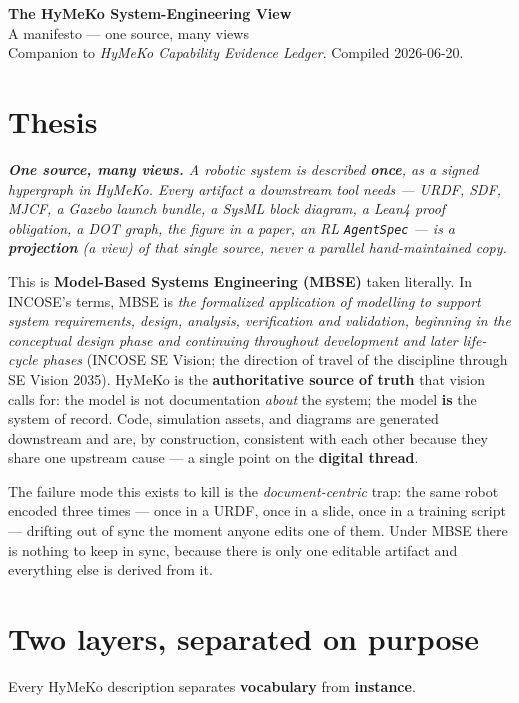 \documentclass[11pt]{article}
\newcommand{\code}[1]{\texttt{\small #1}}
\newenvironment{quotebox}{\begin{center}\begin{minipage}{0.92\textwidth}\itshape\color{black!75}}{\end{minipage}\end{center}}
\begin{document}
\begin{center}
  {\LARGE\bfseries The HyMeKo System-Engineering View}\\[3pt]
  {\large A manifesto --- one source, many views}\\[6pt]
  {\small Companion to \emph{HyMeKo Capability Evidence Ledger}. Compiled 2026-06-20.}
\end{center}
\vspace{4pt}

\section{Thesis}
\begin{quotebox}
\textbf{One source, many views.} A robotic system is described \textbf{once}, as a signed
hypergraph in HyMeKo. Every artifact a downstream tool needs --- URDF, SDF, MJCF, a Gazebo launch
bundle, a SysML block diagram, a Lean4 proof obligation, a DOT graph, the figure in a paper, an RL
\code{AgentSpec} --- is a \textbf{projection} (a \emph{view}) of that single source, never a parallel
hand-maintained copy.
\end{quotebox}

This is \textbf{Model-Based Systems Engineering (MBSE)} taken literally. In INCOSE's terms, MBSE is
\emph{the formalized application of modelling to support system requirements, design, analysis,
verification and validation, beginning in the conceptual design phase and continuing throughout
development and later life-cycle phases} (INCOSE SE Vision; the direction of travel of the discipline
through SE Vision 2035). HyMeKo is the \textbf{authoritative source of truth} that vision calls for:
the model is not documentation \emph{about} the system; the model \textbf{is} the system of record.
Code, simulation assets, and diagrams are generated downstream and are, by construction, consistent
with each other because they share one upstream cause --- a single point on the \textbf{digital
thread}.

The failure mode this exists to kill is the \emph{document-centric} trap: the same robot encoded
three times --- once in a URDF, once in a slide, once in a training script --- drifting out of sync
the moment anyone edits one of them. Under MBSE there is nothing to keep in sync, because there is
only one editable artifact and everything else is derived from it.

\section{Two layers, separated on purpose}
Every HyMeKo description separates \textbf{vocabulary} from \textbf{instance}.
\end{document}
